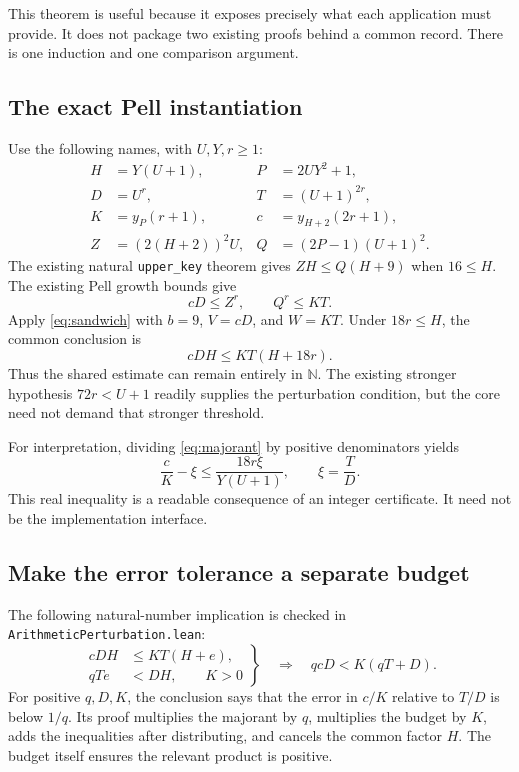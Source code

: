 \documentclass[11pt,a4paper]{article}
\newcommand{\N}{\mathbb N}
\newcommand{\code}[1]{\nolinkurl{#1}}
\begin{document}
This theorem is useful because it exposes precisely what each application must
provide. It does not package two existing proofs behind a common record.
There is one induction and one comparison argument.

\subsection{The exact Pell instantiation}

Use the following names, with \(U,Y,r\ge1\):
\begin{align*}
 H&=Y(U+1),& P&=2UY^2+1,\\
 D&=U^r,& T&=(U+1)^{2r},\\
 K&=y_P(r+1),& c&=y_{H+2}(2r+1),\\
 Z&=(2(H+2))^2U,& Q&=(2P-1)(U+1)^2.
\end{align*}
The existing natural \code{upper_key} theorem gives
\(ZH\le Q(H+9)\) when \(16\le H\).
The existing Pell growth bounds give
\[
 cD\le Z^r,\qquad Q^r\le KT.
\]
Apply \eqref{eq:sandwich} with \(b=9\), \(V=cD\), and \(W=KT\).
Under \(18r\le H\), the common conclusion is
\begin{equation}
 \boxed{cDH\le KT(H+18r).}
 \label{eq:majorant}
\end{equation}
Thus the shared estimate can remain entirely in \(\N\).
The existing stronger hypothesis \(72r<U+1\) readily supplies the perturbation
condition, but the core need not demand that stronger threshold.

For interpretation, dividing \eqref{eq:majorant} by positive denominators yields
\[
 \frac cK-\xi\le\frac{18r\xi}{Y(U+1)},
 \qquad \xi=\frac{T}{D}.
\]
This real inequality is a readable consequence of an integer certificate.
It need not be the implementation interface.

\subsection{Make the error tolerance a separate budget}

The following natural-number implication is checked in
\code{ArithmeticPerturbation.lean}:
\begin{equation}
 \left.
 \begin{aligned}
 cDH&\le KT(H+e),\\
 qTe&<DH,\qquad K>0
 \end{aligned}
 \right\}
 \quad\Longrightarrow\quad
 qcD<K(qT+D).
 \label{eq:budget}
\end{equation}
For positive \(q,D,K\), the conclusion says that the error in \(c/K\)
relative to \(T/D\) is below \(1/q\). Its proof multiplies the majorant by
\(q\), multiplies the budget by \(K\), adds the inequalities after distributing,
and cancels the common factor \(H\). The budget itself ensures the relevant
product is positive.
\end{document}
